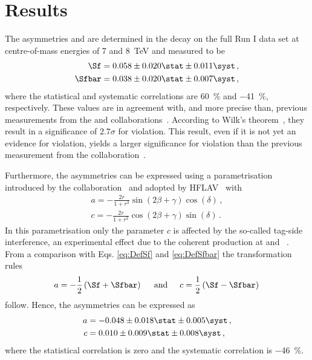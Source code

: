 \chapter{Results}
\label{chap:results}

\linespread{1.08}\selectfont
The \CP asymmetries \Sf and \Sfbar are determined in the \BdToDpi decay on the full \lhcb Run I data set at centre-of-mass energies of \num{7} and \SI{8}{\tera\electronvolt} and measured to be
\begin{equation}
\begin{aligned}
\Sf&=0.058\pm0.020\stat\pm0.011\syst\,,\\
\Sfbar&=0.038\pm0.020\stat\pm0.007\syst\,,
\end{aligned}
\end{equation}
where the statistical and systematic correlations are \SI{60}{\percent} and \SI{-41}{\percent}, respectively.
These values are in agreement with, and more precise than, previous measurements from the \belle and \babar collaborations~\cite{Ronga:2006hv,Aubert:2006tw}.
According to Wilk's theorem~\cite{wilks1938}, they result in a significance of $2.7\sigma$ for \mbox{\CP violation}.
This result, even if it is not yet an evidence for \CP violation, yields a larger significance for \CP violation than the previous measurement from the \belle collaboration~\cite{Ronga:2006hv}.

Furthermore, the \CP asymmetries can be expressed using a parametrisation introduced by the \babar collaboration~\cite{Aubert:2006tw} and adopted by HFLAV~\cite{HFLAV2016} with
\begin{equation}
\begin{aligned}
a=-\frac{2r}{1+r^2}\sin\!\left(2\beta+\gamma\right)\cos\!\left(\delta\right)\,,\\
c=-\frac{2r}{1+r^2}\cos\!\left(2\beta+\gamma\right)\sin\!\left(\delta\right)\,.
\end{aligned}
\end{equation}
In this parametrisation only the parameter $c$ is affected by the so-called tag-side interference, an experimental effect due to the coherent \Bz\Bzb production at \belle and \babar~\cite{Long:2003wq}.
From a comparison with Eqs. \eqref{eq:DefSf} and \eqref{eq:DefSfbar} the transformation rules
\begin{equation}
a=-\frac{1}{2}\left(\Sf+\Sfbar\right)\hspace{0.5cm}\text{and}\hspace{0.5cm}c=\frac{1}{2}\left(\Sf-\Sfbar\right)\\
\end{equation}
follow.
Hence, the \CP asymmetries can be expressed as
\begin{equation}
\begin{aligned}
a&=-0.048\pm0.018\stat\pm0.005\syst\,,\\
c&=0.010\pm0.009\stat\pm0.008\syst\,,\\
\end{aligned}
\end{equation}
where the statistical correlation is zero and the systematic correlation is \SI{-46}{\percent}.

